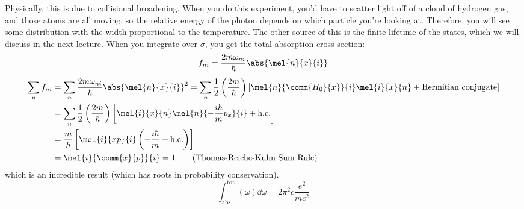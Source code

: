 \documentclass[a4paper,twoside,master.tex]{subfiles}
\begin{document}
Physically, this is due to collisional broadening. When you do this experiment, you'd have to scatter light off of a cloud of hydrogen gas, and those atoms are all moving, so the relative energy of the photon depends on which particle you're looking at. Therefore, you will see some distribution with the width proportional to the temperature. The other source of this is the finite lifetime of the states, which we will discuss in the next lecture. When you integrate over $ \sigma $, you get the total absorption cross section:
\begin{equation}
    f_{ni} = \frac{2m \omega_{ni}}{\hbar} \abs{\mel{n}{x}{i}}
\end{equation}
\begin{align}\label{eq:trk_sum_rule}
    \sum_n f_{ni} &= \sum_n \frac{2m \omega_{ni}}{\hbar} \abs{\mel{n}{x}{i}}^2 = \sum_n \frac{1}{2} \left( \frac{2 m}{\hbar} \right) \left[ \mel{n}{\comm{H_0}{x}}{i} \mel{i}{x}{n} + \text{Hermitian conjugate} \right] \\
    &= \sum_n \frac{1}{2} \left( \frac{2m}{\hbar} \right) \left[ \mel{i}{x}{n} \mel{n}{- \frac{\imath \hbar}{m} p_x}{i} + \text{h.c.} \right] \\
    &= \frac{m}{\hbar} \left[ \mel{i}{xp}{i} \left( - \frac{\imath \hbar}{m} + \text{h.c.} \right) \right] \\
    &= \mel{i}{\comm{x}{p}}{i} = 1\tag{Thomas-Reiche-Kuhn Sum Rule}
\end{align}
which is an incredible result (which has roots in probability conservation).
\begin{equation}
    \int_{\text{abs}}^{\text{tot}}(\omega) \dd{\omega} = 2 \pi^2 c \frac{e^2}{m c^2}
\end{equation}
\end{document}
